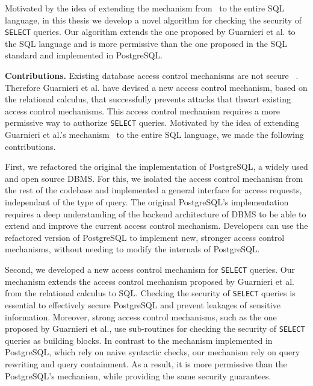 Motivated by the idea of extending the mechanism from~\cite{guarnieri2016strong} to the entire SQL language, in this thesis we develop a novel algorithm for checking the security of \texttt{SELECT} queries.
%
Our algorithm extends the one proposed by Guarnieri et al. to the SQL language and is more permissive than the one proposed in the SQL standard and  implemented in PostgreSQL.

\smallskip
\noindent
{\bf Contributions.}
Existing database access control mechanisms are not secure~\cite{guarnieri2016strong} . 
%
Therefore Guarnieri et al. have devised a new access control mechanism, based on the relational calculus, that successfully prevents attacks that thwart existing access control mechanisms.
%
This access control mechanism requires a more permissive way to authorize \texttt{SELECT} queries.
%
Motivated by the idea of extending Guarnieri et al.'s mechanism~\cite{guarnieri2016strong} to the entire SQL language,  we made the following contributions.

First, we refactored the original the implementation of PostgreSQL, a widely used and open source DBMS.
%
For this, we isolated the access control mechanism from the rest of the codebase and implemented a general interface for access requests, independant of the type of query. 
%
The original PostgreSQL's implementation requires a deep understanding of the backend architecture of DBMS to be able to extend and improve the current access control mechanism.
%
Developers can use the refactored version of PostgreSQL to implement new, stronger access control mechanisms, without needing to modify the internals of PostgreSQL.



Second, we developed a new access control mechanism for \texttt{SELECT} queries.
%
Our mechanism extends the access control mechanism proposed by Guarnieri et al.~\cite{guarnieri2016strong} from the relational calculus to SQL.
%
%
%
%
Checking the security of \texttt{SELECT} queries is essential to effectively secure  PostgreSQL and prevent leakages of sensitive information. 
%
Moreover, strong access control mechanisms, such as the one proposed by Guarnieri et al., use sub-routines for checking the security of \texttt{SELECT} queries as building blocks. 
%
In contrast to the mechanism implemented in PostgreSQL, which rely on naive syntactic checks, our mechanism rely on query rewriting and query containment.
%
As a result, it is more permissive than the PostgreSQL's mechanism, while providing the same security guarantees. 
%

